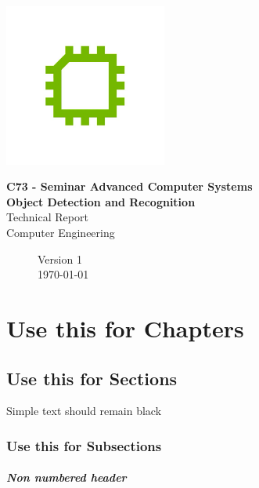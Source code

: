 \documentclass[openany]{scrreprt}
\begin{document}
\begin{titlepage}
	\flushright
	\includegraphics[width=0.4\textwidth]{./data/CE_Logo.png}\par\vspace{0cm}
	\Large{\textbf{\textcolor{htwgrey}{C73 - Seminar Advanced Computer Systems}}}\\
	\Large{\textbf{\textcolor{htwgrey}{Object Detection and Recognition}}}\\
	\Large{\textcolor{htwgreen}{Technical Report}}\\
	\Large{\textcolor{htwgrey}{Computer Engineering}}\\
	\begin{figure}[b]
	\flushright
	Version 1 \ \\
	\today{}
	\end{figure}
\end{titlepage}

\tableofcontents

\newpage

\chapter{Use this for Chapters} %

\section{Use this for Sections} %

Simple text should remain black

\subsection{Use this for Subsections}

\paragraph{Non numbered header}\ \\
\end{document}
